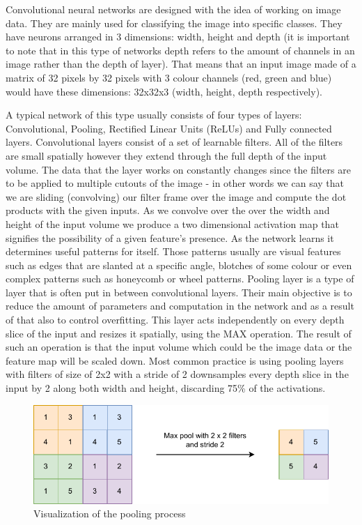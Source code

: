\documentclass{ijisa}
\begin{document}
Convolutional neural networks are designed with the idea of working on image data. They are mainly used for classifying the image into specific classes. They have neurons arranged in 3 dimensions: width, height and depth (it is important to note that in this type of networks depth refers to the amount of channels in an image rather than the depth of layer). That means that an input image made of a matrix of 32 pixels by 32 pixels with 3 colour channels (red, green and blue) would have these dimensions: 32x32x3 (width, height, depth respectively). 

A typical network of this type usually consists of four types of layers: Convolutional, Pooling, Rectified Linear Units (ReLUs) and Fully connected layers. Convolutional layers consist of a set of learnable filters. All of the filters are small spatially however they extend through the full depth of the input volume. The data that the layer works on constantly changes since the filters are to be applied to multiple cutouts of the image - in other words we can say that we are sliding (convolving) our filter frame over the image and compute the dot products with the given inputs. As we convolve over the over the width and height of the input volume we produce a two dimensional activation map that signifies the possibility of a given feature's presence. As the network learns it determines useful patterns for itself. Those patterns usually are visual features such as edges that are slanted at a specific angle, blotches of some colour or even complex patterns such as honeycomb or wheel patterns. Pooling layer is a type of layer that is often put in between convolutional layers. Their main objective is to reduce the amount of parameters and computation in the network and as a result of that also to control overfitting. This layer acts independently on every depth slice of the input and resizes it spatially, using the MAX operation. The result of such an operation is that the input volume which could be the image data or the feature map will be scaled down. Most common practice is using pooling layers with filters of size of 2x2 with a stride of 2 downsamples every depth slice in the input by 2 along both width and height, discarding 75\% of the activations.

\begin{figure}[!h]
\centering
\includegraphics[width=1\columnwidth]{Images/pooling.pdf}
\caption{Visualization of the pooling process} \label{fig:fig3}
\end{figure}
\end{document}
